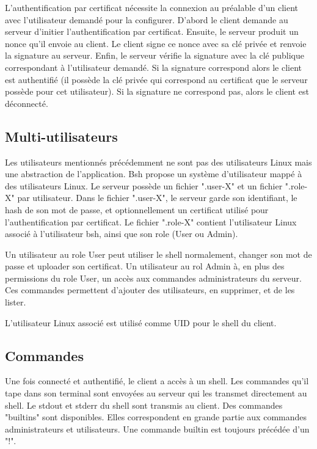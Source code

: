 \documentclass[french]{article}
\begin{document}
\medspace

L'authentification par certificat nécessite la connexion au préalable d'un client avec l'utilisateur demandé pour la configurer. D'abord le client demande au serveur d'initier l'authentification par certificat. Ensuite, le serveur produit un nonce qu'il envoie au client. Le client signe ce nonce avec sa clé privée et renvoie la signature au serveur. Enfin, le serveur vérifie la signature avec la clé publique correspondant à l'utilisateur demandé. Si la signature correspond alors le client est authentifié (il possède la clé privée qui correspond au certificat que le serveur possède pour cet utilisateur). Si la signature ne correspond pas, alors le client est déconnecté.

\subsection{Multi-utilisateurs}

Les utilisateurs mentionnés précédemment ne sont pas des utilisateurs Linux mais une abstraction de l'application. Bsh propose un système d'utilisateur mappé à des utilisateurs Linux. Le serveur possède un fichier ".user-X" et un fichier ".role-X" par utilisateur. Dans le fichier ".user-X", le serveur garde son identifiant, le hash de son mot de passe, et optionnellement un certificat utilisé pour l'authentification par certificat. Le fichier ".role-X" contient l'utilisateur Linux associé à l'utilisateur bsh, ainsi que son role (User ou Admin).

\medspace

Un utilisateur au role User peut utiliser le shell normalement, changer son mot de passe et uploader son certificat.
Un utilisateur au rol Admin à, en plus des permissions du role User, un accès aux commandes administrateurs du serveur. Ces commandes permettent d'ajouter des utilisateurs, en supprimer, et de les lister.

\medspace

L'utilisateur Linux associé est utilisé comme UID pour le shell du client.

\subsection{Commandes}

Une fois connecté et authentifié, le client a accès à un shell. Les commandes qu'il tape dans son terminal sont envoyées au serveur qui les transmet directement au shell. Le stdout et stderr du shell sont transmis au client. Des commandes "builtins" sont disponibles. Elles correspondent en grande partie aux commandes administrateurs et utilisateurs. Une commande builtin est toujours précédée d'un "!".
\end{document}
